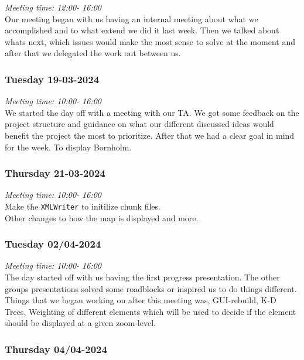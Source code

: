 \emph{Meeting time: 12:00- 16:00 }\\
Our meeting began with us having an internal meeting about what we
accomplished and to what extend we did it last week. Then we talked
about whats next, which issues would make the most sense to solve at the
moment and after that we delegated the work out between us.

\hypertarget{tuesday-19-03-2024}{%
\subsubsection*{Tuesday 19-03-2024}\label{tuesday-19-03-2024}}

\emph{Meeting time: 10:00- 16:00 }\\
We started the day off with a meeting with our TA. We got some feedback
on the project structure and guidance on what our different discussed
ideas would benefit the project the most to prioritize. After that we
had a clear goal in mind for the week. To display Bornholm.

\hypertarget{thursday-21-03-2024}{%
\subsubsection*{Thursday 21-03-2024}\label{thursday-21-03-2024}}

\emph{Meeting time: 10:00- 16:00 }\\
Make the \texttt{XMLWriter} to initilize chunk files.\\
Other changes to how the map is displayed and more.

\hypertarget{tuesday-0204-2024}{%
\subsubsection*{Tuesday 02/04-2024}\label{tuesday-0204-2024}}

\emph{Meeting time: 10:00- 16:00 }\\
The day started off with us having the first progress presentation. The
other groups presentations solved some roadblocks or inspired us to do
things different. Things that we began working on after this meeting
was, GUI-rebuild, K-D Trees, Weighting of different elements which will
be used to decide if the element should be displayed at a given
zoom-level.

\hypertarget{thursday-0404-2024}{%
\subsubsection*{Thursday 04/04-2024}\label{thursday-0404-2024}}

